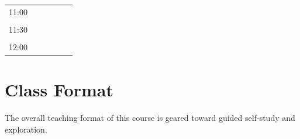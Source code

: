 \documentclass[a4paper]{article}
\begin{document}
\begin{table}[ht!]
\begin{tabular}{|c|c|c|c|c|c|}
					11:00         &                                                                                          &                                                                    &                                                                      &                                                                     &                                                                   \\
					&                                                                                          &                                                                    &                                                                      &                                                                     &                                                                   \\
					11:30         &                                                                                          &                                                                    &                                                                      &                                                                     &                                                                   \\
					&                                                                                          &                                                                    &                                                                      &                                                                     &                                                                   \\
					12:00         &                                                                                          &                                                                    &                                                                      &                                                                     &                                                                   \\ \hline
				\end{tabular}%
		\end{table}

	\section{Class Format}
		
		The overall teaching format of this course is geared toward guided self-study and exploration. \todo{}
		
\end{document}
